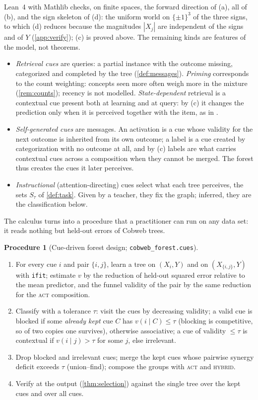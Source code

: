\documentclass[11pt]{article}
\theoremstyle{definition}
\newtheorem{procedure}[theorem]{Procedure}
\theoremstyle{remark}
\begin{document}
Lean~4 with Mathlib checks, on finite spaces, the forward direction of (a), all of (b),
and the sign skeleton of (d): the uniform world on $\{\pm1\}^3$ of the three signs, to which
(d) reduces because the magnitudes $|X_j|$ are independent of the signs and of $Y$
(\cref{app:verify}); (c) is proved above.  The remaining kinds are features of the model,
not theorems.
\begin{itemize}[leftmargin=*]
\item \emph{Retrieval cues} are queries: a partial instance with the outcome missing,
  categorized and completed by the tree (\cref{def:messages}).  \emph{Priming} corresponds
  to the count weighting: concepts seen more often weigh more in the mixture
  (\cref{rem:counts}); recency is not modelled.  \emph{State-dependent} retrieval is a
  contextual cue present both at learning and at query: by (c) it changes the prediction
  only when it is perceived together with the item, as in \citet{godden1975}.
\item \emph{Self-generated cues} are messages.  An activation is a cue whose validity for
  the next outcome is inherited from its own outcome; a label is a cue created by
  categorization with no outcome at all, and by (c) labels are what carries contextual
  cues across a composition when they cannot be merged.  The forest thus creates the
  cues it later perceives.
\item \emph{Instructional} (attention-directing) cues select what each tree perceives,
  the sets $S_\tau$ of \cref{def:task}.  Given by a teacher, they fix the graph; inferred,
  they are the classification below.
\end{itemize}

The calculus turns into a procedure that a practitioner can run on any data set: it reads
nothing but held-out errors of Cobweb trees.

\begin{procedure}[Cue-driven forest design; \texttt{cobweb\_forest.cues}]\label{proc:cues}
\leavevmode
\begin{enumerate}[leftmargin=*,noitemsep]
\item For every cue $i$ and pair $\{i,j\}$, learn a tree on $(X_i,Y)$ and on
  $(X_{\{i,j\}},Y)$ with \texttt{ifit}; estimate $v$ by the reduction of held-out squared
  error relative to the mean predictor, and the funnel validity of the pair by the same
  reduction for the \textsc{act} composition.
\item Classify with a tolerance $\tau$: visit the cues by decreasing validity; a valid cue
  is blocked if some \emph{already kept} cue $C$ has $v(i\mid C)\le\tau$ (blocking is
  competitive, so of two copies one survives), otherwise associative; a cue of validity
  $\le\tau$ is contextual if $v(i\mid j)>\tau$ for some $j$, else irrelevant.
\item Drop blocked and irrelevant cues; merge the kept cues whose pairwise synergy deficit
  exceeds $\tau$ (union--find); compose the groups with \textsc{act} and \textsc{hybrid}.
\item Verify at the output (\cref{thm:selection}) against the single tree over the kept
  cues and over all cues.
\end{enumerate}
\end{procedure}
\end{document}

